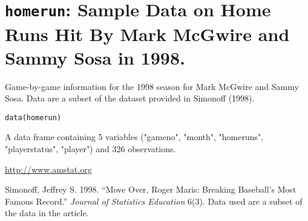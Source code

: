  \section{{\tt homerun}: Sample Data on Home Runs Hit By Mark McGwire and Sammy Sosa in 1998.}\label{ss:homerun}
\begin{Description}\relax
Game-by-game information for the 1998 season for Mark McGwire and Sammy Sosa. Data are a subset of the dataset provided in Simonoff (1998).
\end{Description}
\begin{Usage}
\begin{verbatim}data(homerun)\end{verbatim}
\end{Usage}
\begin{Format}\relax
A data frame containing 5 variables ("gameno", "month", "homeruns", "playerstatus", "player") and 326 observations.  
\end{Format}
\begin{Source}\relax
\url{http://www.amstat.org}
\end{Source}
\begin{References}\relax
Simonoff, Jeffrey S. 1998. ``Move Over, Roger Maris: Breaking Baseball's Most Famous Record.'' {\it Journal of Statistics Education} 6(3). Data used are a subset of the data in the article. \bsl{}
\end{References}


